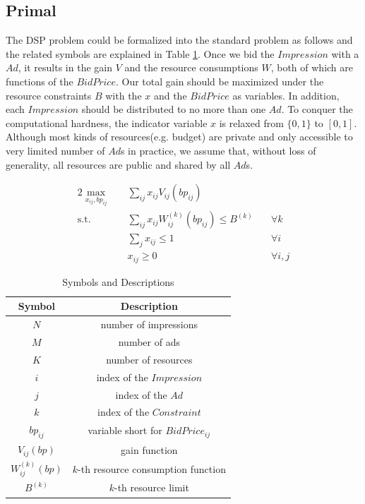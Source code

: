 \documentclass{article}
\newcommand{\sumj}{\sum\limits_j}
\newcommand{\sumij}{\sum\limits_{ij}}
\newcommand{\sx}{x_{ij}}
\newcommand{\sbp}{bp_{ij}}
\newcommand{\sV}{V_{ij}}
\newcommand{\sW}{W_{ij}^{(k)}}
\newcommand{\sB}{B^{(k)}}
\newcommand{\dspresourceconstraint}{\sumij \sx \sW(\sbp) \le \sB}
\newcommand{\assignmentconstraint}{\sumj \sx \le 1}
\begin{document}
\subsection{Primal} \label{Primal}

The DSP problem could be formalized into the standard problem as follows and the related symbols are explained in Table \ref{TableSymbols}.
Once we bid the $Impression$ with a $Ad$, it results in the gain $V$ and the resource consumptions $W$, both of which are functions of the $BidPrice$.
Our total gain should be maximized under the resource constraints $B$ with the $x$ and the $BidPrice$ as variables.
In addition, each $Impression$ should be distributed to no more than one $Ad$.
To conquer the computational hardness, the indicator variable $x$ is relaxed from $\{0, 1\}$ to $[0, 1]$.
Although most kinds of resources(e.g. budget) are private and only accessible to very limited number of $Ad$s in practice,
    we assume that, without loss of generality, all resources are public and shared by all $Ad$s.

\begin{alignat}{2}
    \max\limits_{\sx, \sbp} \quad & \sumij \sx \sV(\sbp) \quad    & {} \\
    \mbox{s.t.} \quad             & \dspresourceconstraint \quad  & \forall k \\
    \quad                         & \assignmentconstraint \quad   & \forall i \\
    \quad                         & \sx \ge 0 \quad               & \forall i,j
\end{alignat}

\begin{table}[h]
\caption{Symbols and Descriptions\label{TableSymbols}}
\begin{center}
\begin{tabular}{c|c}
\hline
\textbf{Symbol} & \textbf{Description} \\
\hline
\hline
$N$             & number of impressions \\
$M$             & number of ads \\
$K$             & number of resources \\
$i$             & index of the $Impression$ \\
$j$             & index of the $Ad$ \\
$k$             & index of the $Constraint$ \\
$\sbp$          & variable short for $BidPrice_{ij}$ \\
$\sV(bp)$       & gain function \\
$\sW(bp)$       & $k$-th resource consumption function \\
$\sB$           & $k$-th resource limit \\
\hline
\end{tabular}
\end{center}
\end{table}
\end{document}
